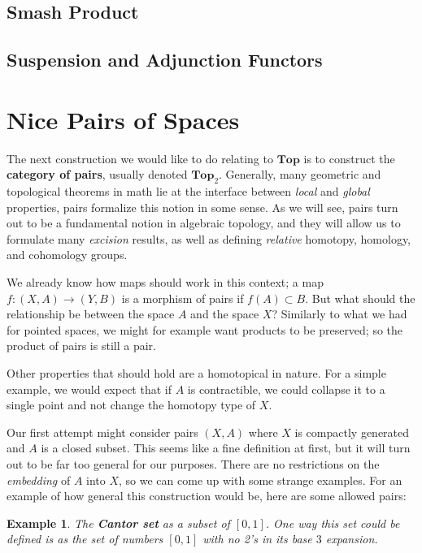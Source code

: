 \documentclass{article}
\newtheorem{example}[definition]{Example}
\begin{document}
\subsection{Smash Product}

\subsection{Suspension and Adjunction Functors}

\section{Nice Pairs of Spaces}

The next construction we would like to do relating to $\mathbf{Top}$ is to construct the \textbf{category of pairs}, usually denoted $\mathbf{Top}_2$. Generally, many geometric and topological theorems in math lie at the interface between \emph{local} and \emph{global} properties, pairs formalize this notion in some sense.
As we will see, pairs turn out to be a fundamental notion in algebraic topology, and they will allow us to formulate many \emph{excision} results, as well as defining \emph{relative} homotopy, homology, and cohomology groups.

We already know how maps should work in this context; a map $f : (X, A) \to (Y, B)$ is a morphism of pairs if $f(A)\subset B$. But what should the relationship be between the space $A$ and the space $X$? Similarly to what we had for pointed spaces, we might for example want products to be preserved; so the product of pairs is still a pair. 

Other properties that should hold are a homotopical in nature. For a simple example, we would expect that if $A$ is contractible, we could collapse it to a single point and not change the homotopy type of $X$.

Our first attempt might consider pairs $(X,A)$ where $X$ is compactly generated and $A$ is a closed subset. This seems like a fine definition at first, but it will turn out to be far too general for our purposes. There are no restrictions on the \emph{embedding} of $A$ into $X$, so we can come up with some strange examples. For an example of how general this construction would be, here are some allowed pairs:

\begin{example}
  The \textbf{Cantor set} as a subset of $[0,1]$. One way this set could be defined is as the set of numbers $[0,1]$ with no 2's in its base $3$ expansion.
\end{example}
\end{document}
